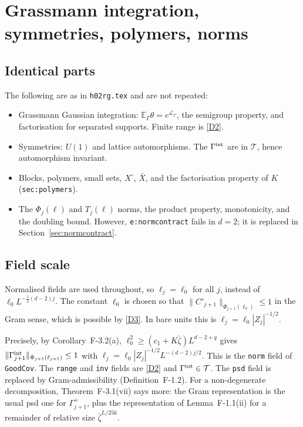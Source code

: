 \documentclass[11pt]{amsart}
\theoremstyle{definition}
\theoremstyle{remark}
\numberwithin{equation}{section}
\newcommand{\E}{\mathbb{E}}
\newcommand{\cL}{\mathcal{L}}
\newcommand{\cT}{\mathcal{T}}
\newcommand{\hr}{\texttt{h02rg.tex}}
\begin{document}
\section{Grassmann integration, symmetries, polymers, norms}
\label{sec:grassmann}

\subsection{Identical parts}
The following are as in \hr{} and are not repeated:
\begin{itemize}
\item Grassmann Gaussian integration: $\E_\Gamma\theta=e^{\cL_\Gamma}$, the semigroup property,
  and factorisation for separated supports. Finite range is \ref{D2}.
\item Symmetries: $U(1)$ and lattice automorphisms. The $\Gamma^{\rm int}$ are in $\cT$, hence
  automorphism invariant.
\item Blocks, polymers, small sets, $X^\square$, $\bar X$, and the factorisation property of
  $K$ (\texttt{sec:polymers}).
\item The $\Phi_j(\ell)$ and $T_j(\ell)$ norms, the product property, monotonicity, and the
  doubling bound. However, \texttt{e:normcontract} fails in $d=2$; it is replaced in
  Section~\ref{sec:normcontract}.
\end{itemize}

\subsection{Field scale}
Normalised fields are used throughout, so $\ell_j=\ell_0$ for all $j$, instead of
$\ell_0L^{-\frac12(d-2)j}$. The constant $\ell_0$ is chosen so that
$\|C'_{j+1}\|_{\Phi_{j+1}(\ell_0)}\le1$ in the Gram sense, which is possible by \ref{D3}. In bare units this is
$\ell_j=\ell_0|Z_j|^{-1/2}$.

Precisely, by Corollary~F-3.2(a), $\ell_0^2\ge(c_1+K\bar\zeta)L^{d-2+q}$ gives
$\|\Gamma^{\rm int}_{j+1}\|_{\Phi_{j+1}(\ell_{j+1})}\le1$ with
$\ell_j=\ell_0|Z_j|^{-1/2}L^{-(d-2)j/2}$. This is the \texttt{norm} field of
\texttt{GoodCov}. The \texttt{range} and \texttt{inv} fields are \ref{D2} and
$\Gamma^{\rm int}\in\cT$. The \texttt{psd} field is replaced by Gram-admissibility
(Definition~F-1.2). For a non-degenerate decomposition, Theorem~F-3.1(vii) says more: the
Gram representation is the usual psd one for $\Gamma^+_{j+1}$, plus the representation of
Lemma~F-1.1(ii) for a remainder of relative size $\bar\zeta^{L/256}$.
\end{document}
